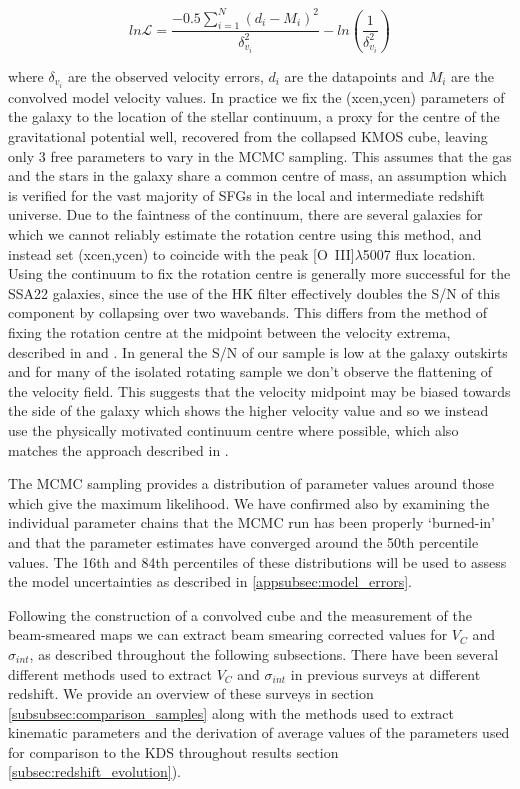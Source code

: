 \documentclass[fleqn,usenatbib]{mn2e}
\newcommand{\Lagr}{\mathcal{L}}
\begin{document}
\begin{equation}\label{eq:likelihood}
   ln\Lagr = \frac{-0.5\sum_{i=1}^{N}(d_{i} - M_{i})^{2}}{\delta_{v_{i}}^{2}} - ln\left(\frac{1}{\delta_{v_{i}}^{2}}\right)
\end{equation}

\noindent
where $\delta_{v_{i}}$ are the observed velocity errors, $d_{i}$ are the datapoints and $M_{i}$ are the convolved model velocity values.
In practice we fix the (xcen,ycen) parameters of the galaxy to the location of the stellar continuum, a proxy for the centre of the gravitational potential well, recovered from the collapsed KMOS cube, leaving only 3 free parameters to vary in the MCMC sampling.
This assumes that the gas and the stars in the galaxy share a common centre of mass, an assumption which is verified for the vast majority of SFGs in the local and intermediate redshift universe.
Due to the faintness of the continuum, there are several galaxies for which we cannot reliably estimate the rotation centre using this method, and instead set (xcen,ycen) to coincide with the peak [O~{\sc III}]$\lambda$5007 flux location.
Using the continuum to fix the rotation centre is generally more successful for the SSA22 galaxies, since the use of the HK filter effectively doubles the S/N of this component by collapsing over two wavebands.
This differs from the method of fixing the rotation centre at the midpoint between the velocity extrema, described in \cite{Wisnioski2015} and \cite{Rodrigues2016}.
In general the S/N of our sample is low at the galaxy outskirts and for many of the isolated rotating sample we don't observe the flattening of the velocity field.
This suggests that the velocity midpoint may be biased towards the side of the galaxy which shows the higher velocity value and so we instead use the physically motivated continuum centre where possible, which also matches the approach described in \cite{Harrison2017}.

The MCMC sampling provides a distribution of parameter values around those which give the maximum likelihood.
We have confirmed also by examining the individual parameter chains that the MCMC run has been properly `burned-in' and that the parameter estimates have converged around the 50th percentile values.
The 16th and 84th percentiles of these distributions will be used to assess the model uncertainties as described in \cref{appsubsec:model_errors}.

Following the construction of a convolved cube and the measurement of the beam-smeared maps we can extract beam smearing corrected values for $V_{C}$ and $\sigma_{int}$, as described throughout the following subsections.
There have been several different methods used to extract $V_{C}$ and $\sigma_{int}$ in previous surveys at different redshift.
We provide an overview of these surveys in section \cref{subsubsec:comparison_samples} along with the methods used to extract kinematic parameters and the derivation of average values of the parameters used for comparison to the KDS throughout results section \cref{subsec:redshift_evolution}).
\end{document}
